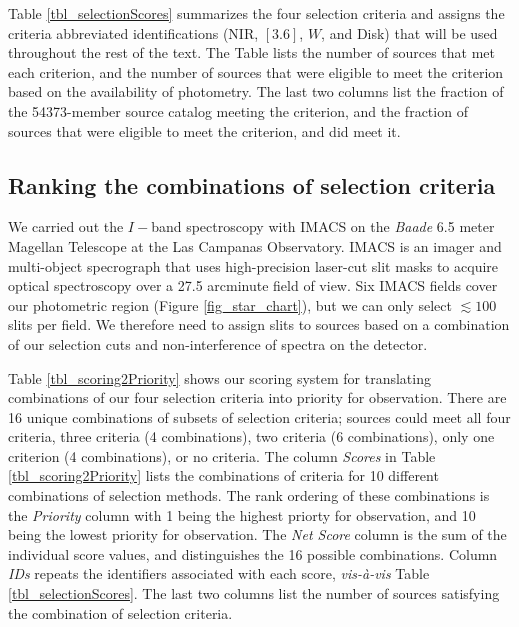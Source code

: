 Table \ref{tbl_selectionScores} summarizes the four selection criteria and assigns the criteria abbreviated identifications (NIR, $[3.6]$, $W$, and Disk) that will be used throughout the rest of the text.  The Table lists the number of sources that met each criterion, and the number of sources that were eligible to meet the criterion based on the availability of photometry.  The last two columns list the fraction of the 54373-member source catalog meeting the criterion, and the fraction of sources that were eligible to meet the criterion, and did meet it.

\subsection{Ranking the combinations of selection criteria}

We carried out the $I-$band spectroscopy with IMACS \citep{2011PASP..123..288D} on the \emph{Baade} 6.5 meter Magellan Telescope \citep{2003SPIE.4837..910S} at the Las Campanas Observatory.  IMACS is an imager and multi-object specrograph that uses high-precision laser-cut slit masks to acquire optical spectroscopy over a 27.5 arcminute field of view.  Six IMACS fields cover our photometric region (Figure \ref{fig_star_chart}), but we can only select $\lesssim100$ slits per field.  We therefore need to assign slits to sources based on a combination of our selection cuts and non-interference of spectra on the detector.  

Table \ref{tbl_scoring2Priority} shows our scoring system for translating combinations of our four selection criteria into priority for observation.  There are 16 unique combinations of subsets of selection criteria; sources could meet all four criteria, three criteria (4 combinations), two criteria (6 combinations), only one criterion (4 combinations), or no criteria.  The column \emph{Scores} in Table \ref{tbl_scoring2Priority} lists the combinations of criteria for 10 different combinations of selection methods.  The rank ordering of these combinations is the \emph{Priority} column with 1 being the highest priorty for observation, and 10 being the lowest priority for observation.  The \emph{Net Score} column is the sum of the individual score values, and distinguishes the 16 possible combinations.  Column \emph{IDs} repeats the identifiers associated with each score, \emph{vis-\`a-vis} Table \ref{tbl_selectionScores}.  The last two columns list the number of sources satisfying the combination of selection criteria.  

